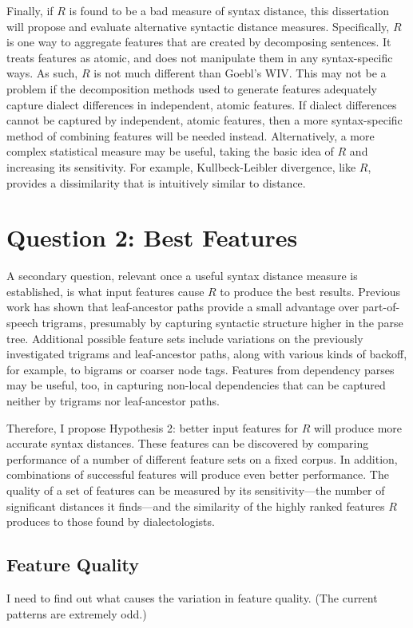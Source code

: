 Finally, if $R$ is found to be a bad measure of syntax distance, this
dissertation will propose and evaluate alternative syntactic distance
measures. Specifically, $R$ is one way to aggregate features that are
created by decomposing sentences. It treats features as atomic, and
does not manipulate them in any syntax-specific ways. As such, $R$ is
not much different than Goebl's WIV. This may not be a problem if the
decomposition methods used to generate features adequately capture
dialect differences in independent, atomic features. If dialect
differences cannot be captured by independent, atomic features, then a
more syntax-specific method of combining features will be needed
instead. Alternatively, a more complex statistical measure may be
useful, taking the basic idea of $R$ and increasing its
sensitivity. For example, Kullbeck-Leibler divergence, like $R$,
provides a dissimilarity that is intuitively similar to distance.


\section{Question 2: Best Features}

A secondary question, relevant once a useful syntax distance measure
is established, is what input features cause $R$ to produce the best
results.  Previous work has shown that leaf-ancestor paths provide a
small advantage over part-of-speech trigrams, presumably by capturing
syntactic structure higher in the parse tree. Additional possible
feature sets include variations on the previously investigated
trigrams and leaf-ancestor paths, along with various kinds of backoff,
for example, to bigrams or coarser node tags. Features from dependency
parses may be useful, too, in capturing non-local dependencies that
can be captured neither by trigrams nor leaf-ancestor paths.

Therefore, I propose Hypothesis 2: better input features
for $R$ will produce more accurate syntax
distances. These features can be discovered by comparing performance
of a number of different feature sets on a fixed corpus. In addition,
combinations of successful features will produce even better
performance.
The quality of a set of features can be
measured by its sensitivity---the number of significant distances it
finds---and the similarity of the highly ranked features $R$ produces
to those found by dialectologists.

\subsection{Feature Quality}

I need to find out what causes the variation in feature quality. (The
current patterns are extremely odd.)


